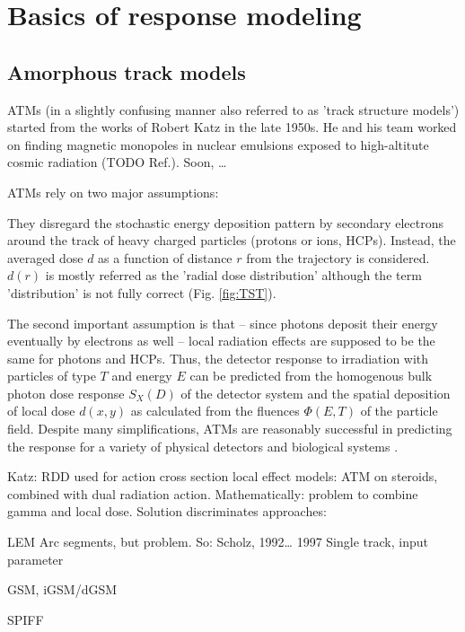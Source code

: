 \chapter{Basics of response modeling}

\section{Amorphous track models}
ATMs (in a slightly confusing manner also referred to as 'track structure
models') started from the works of Robert Katz in the late 1950s. He and his
team worked on finding magnetic monopoles in nuclear emulsions exposed to
high-altitute cosmic radiation (TODO Ref.). Soon, \ldots

ATMs rely on two major assumptions:

\begin{list}
\item{}They disregard the stochastic energy deposition pattern by secondary
electrons around the track of heavy charged particles (protons or
ions, HCPs). Instead, the averaged dose $d$ as a function of
distance $r$ from the trajectory is considered. $d(r)$ is mostly referred as the
'radial dose distribution' although the term 'distribution' is not fully correct
(Fig. \ref{fig:TST}).
\item{}The second important assumption is that -- since photons deposit their
energy eventually by electrons as well -- local radiation effects are supposed
to be the same for photons and HCPs. Thus, the detector response to irradiation
with particles of type $T$ and energy $E$ can be predicted from the homogenous
bulk photon dose response $S_X(D)$ of the detector system and the spatial
deposition of local dose $d(x,y)$ as calculated from the fluences $\Phi(E, T)$
of the particle field. Despite many simplifications, ATMs are reasonably
successful in predicting the response for a variety of physical detectors and
biological systems \cite{Katz_et_al_1972, Waligorski_and_Katz_1980,
Geiss_et_al_1997, Bassler_et_al_2008}.
\end{list}

Katz: RDD used for action cross section
local effect models: ATM on steroids, combined with dual radiation action.
Mathematically: problem to combine gamma and local dose. Solution discriminates
approaches:
\begin{list}
  \item{LEM Arc segments, but problem. So: Scholz, 1992\ldots{} 1997 Single
  track, input parameter}
  \item{GSM, iGSM/dGSM}
  \item{SPIFF}
\end{list}


